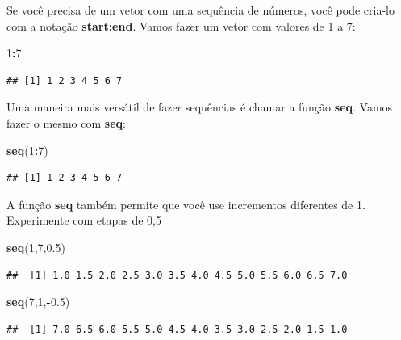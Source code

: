 \documentclass[]{book}
\newenvironment{Shaded}{\begin{snugshade}}{\end{snugshade}}
\newcommand{\DecValTok}[1]{\textcolor[rgb]{0.00,0.00,0.81}{#1}}
\newcommand{\FloatTok}[1]{\textcolor[rgb]{0.00,0.00,0.81}{#1}}
\newcommand{\KeywordTok}[1]{\textcolor[rgb]{0.13,0.29,0.53}{\textbf{#1}}}
\newcommand{\NormalTok}[1]{#1}
\newcommand{\OperatorTok}[1]{\textcolor[rgb]{0.81,0.36,0.00}{\textbf{#1}}}
\begin{document}
Se você precisa de um vetor com uma sequência de números, você pode cria-lo com a notação \textbf{start:end}. Vamos fazer um vetor com valores de 1 a 7:

\begin{Shaded}
\begin{Highlighting}[]
\DecValTok{1}\OperatorTok{:}\DecValTok{7}
\end{Highlighting}
\end{Shaded}

\begin{verbatim}
## [1] 1 2 3 4 5 6 7
\end{verbatim}

Uma maneira mais versátil de fazer sequências é chamar a função \textbf{seq}. Vamos fazer o mesmo com \textbf{seq}:

\begin{Shaded}
\begin{Highlighting}[]
\KeywordTok{seq}\NormalTok{(}\DecValTok{1}\OperatorTok{:}\DecValTok{7}\NormalTok{)}
\end{Highlighting}
\end{Shaded}

\begin{verbatim}
## [1] 1 2 3 4 5 6 7
\end{verbatim}

A função \textbf{seq} também permite que você use incrementos diferentes de 1. Experimente com etapas de 0,5

\begin{Shaded}
\begin{Highlighting}[]
\KeywordTok{seq}\NormalTok{(}\DecValTok{1}\NormalTok{,}\DecValTok{7}\NormalTok{,}\FloatTok{0.5}\NormalTok{)}
\end{Highlighting}
\end{Shaded}

\begin{verbatim}
##  [1] 1.0 1.5 2.0 2.5 3.0 3.5 4.0 4.5 5.0 5.5 6.0 6.5 7.0
\end{verbatim}

\begin{Shaded}
\begin{Highlighting}[]
\KeywordTok{seq}\NormalTok{(}\DecValTok{7}\NormalTok{,}\DecValTok{1}\NormalTok{,}\OperatorTok{-}\FloatTok{0.5}\NormalTok{) }
\end{Highlighting}
\end{Shaded}

\begin{verbatim}
##  [1] 7.0 6.5 6.0 5.5 5.0 4.5 4.0 3.5 3.0 2.5 2.0 1.5 1.0
\end{verbatim}
\end{document}
